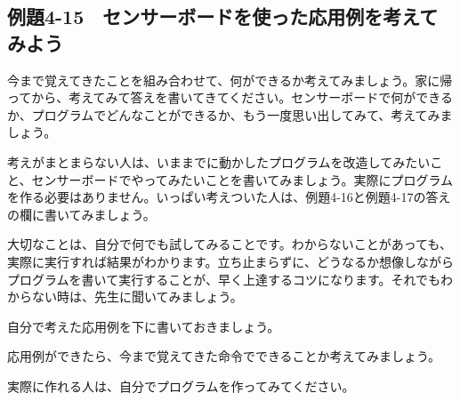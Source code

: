 \newpage
\subsection{例題4-15　センサーボードを使った応用例を考えてみよう}


\begin{description}
    \item {}
\end{description}

今まで覚えてきたことを組み合わせて、何ができるか考えてみましょう。家に帰ってから、考えてみて答えを書いてきてください。センサーボードで何ができるか、プログラムでどんなことができるか、もう一度思い出してみて、考えてみましょう。

考えがまとまらない人は、いままでに動かしたプログラムを改造してみたいこと、センサーボードでやってみたいことを書いてみましょう。実際にプログラムを作る必要はありません。いっぱい考えついた人は、例題4-16と例題4-17の答えの欄に書いてみましょう。

大切なことは、自分で何でも試してみることです。わからないことがあっても、実際に実行すれば結果がわかります。立ち止まらずに、どうなるか想像しながらプログラムを書いて実行することが、早く上達するコツになります。それでもわからない時は、先生に聞いてみましょう。

\begin{description}
    \item {}
\end{description}

自分で考えた応用例を下に書いておきましょう。

応用例ができたら、今まで覚えてきた命令でできることか考えてみましょう。

実際に作れる人は、自分でプログラムを作ってみてください。




